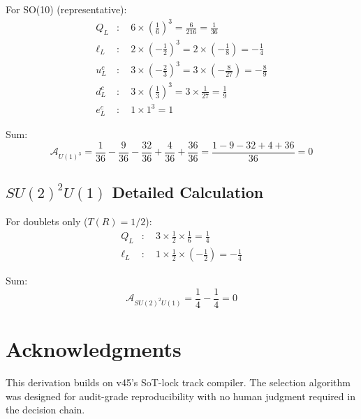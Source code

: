 \documentclass[11pt,a4paper]{article}
\begin{document}
For SO(10) (representative):
\begin{align}
\label{eq:u1-q}
Q_L &: \quad 6 \times \left(\frac{1}{6}\right)^3 = \frac{6}{216} = \frac{1}{36} \\
\label{eq:u1-l}
\ell_L &: \quad 2 \times \left(-\frac{1}{2}\right)^3 = 2 \times \left(-\frac{1}{8}\right) = -\frac{1}{4} \\
\label{eq:u1-uc}
u^c_L &: \quad 3 \times \left(-\frac{2}{3}\right)^3 = 3 \times \left(-\frac{8}{27}\right) = -\frac{8}{9} \\
\label{eq:u1-dc}
d^c_L &: \quad 3 \times \left(\frac{1}{3}\right)^3 = 3 \times \frac{1}{27} = \frac{1}{9} \\
\label{eq:u1-ec}
e^c_L &: \quad 1 \times 1^3 = 1
\end{align}

Sum:
\begin{equation}
\label{eq:u1-sum}
\mathcal{A}_{U(1)^3} = \frac{1}{36} - \frac{9}{36} - \frac{32}{36} + \frac{4}{36} + \frac{36}{36} = \frac{1 - 9 - 32 + 4 + 36}{36} = 0
\end{equation}

\subsection{$SU(2)^2 U(1)$ Detailed Calculation}
\label{app:su2-u1-detail}

For doublets only ($T(R) = 1/2$):
\begin{align}
\label{eq:su2u1-q}
Q_L &: \quad 3 \times \frac{1}{2} \times \frac{1}{6} = \frac{1}{4} \\
\label{eq:su2u1-l}
\ell_L &: \quad 1 \times \frac{1}{2} \times \left(-\frac{1}{2}\right) = -\frac{1}{4}
\end{align}

Sum:
\begin{equation}
\label{eq:su2u1-sum}
\mathcal{A}_{SU(2)^2U(1)} = \frac{1}{4} - \frac{1}{4} = 0
\end{equation}

\section*{Acknowledgments}

This derivation builds on v45's SoT-lock track compiler. The selection algorithm
was designed for audit-grade reproducibility with no human judgment required
in the decision chain.
\end{document}
